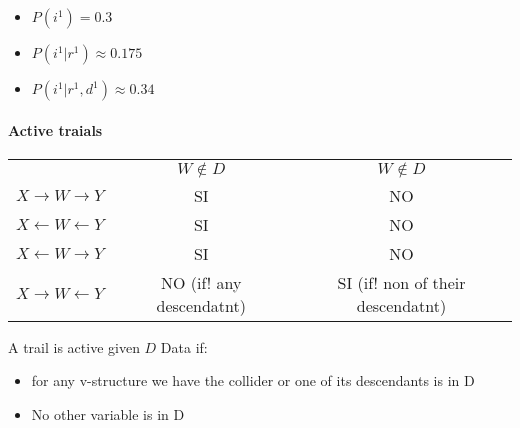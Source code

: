\begin{itemize}
 \item $P(i^1)=0.3$
\item $P(i^1|r^1)\approx 0.175$
 \item $P(i^1|r^1, d^1)\approx 0.34$
\end{itemize}

\paragraph{Active traials}

 \begin{tabular}{c c|c}
  
  & $W \notin D $ &  $W \notin D $ \\
 $X \rightarrow W \rightarrow Y $   & SI  & NO  \\ 
 $X \leftarrow W \leftarrow Y $  & SI & NO\\ 
$X \leftarrow W \rightarrow Y $  & SI& NO\\
$X \rightarrow W \leftarrow Y $  & NO (if! any descendatnt) & SI (if! non of their descendatnt)
 \end{tabular} 
 
 A trail is active given $D$ Data if:
 \begin{itemize}
  \item for any v-structure we have the collider or one of its descendants is in D
  \item No other variable is in D
 \end{itemize}

